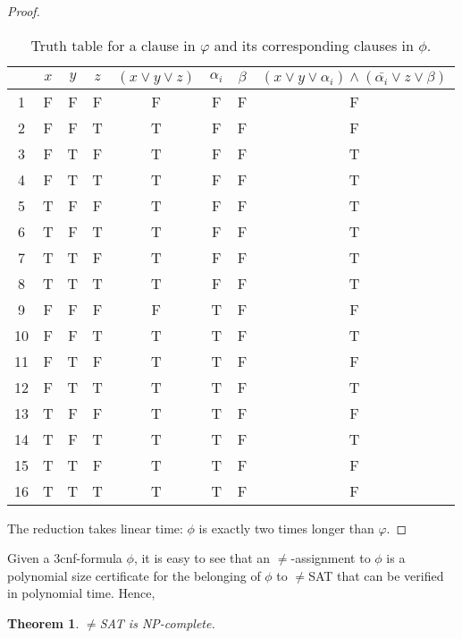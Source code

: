 \documentclass{article}
\newcommand{\theoremname}{Theorem}
\newtheorem{theorem}{\theoremname}
\begin{document}
\begin{proof}
\begin{table}
	\centering
	\caption{Truth table for a clause in $\varphi$ and its corresponding clauses in
	$\phi$.}\label{table}
	\begin{tabular}{|c|ccc|c|cc|c|}
	\hline
	& $x$ & $y$ & $z$ & $(x \lor y \lor z)$ & $\alpha_i$ & $\beta$ & $(x \lor
	y \lor \alpha_i) \land (\bar{\alpha_i} \lor z \lor \beta)$ \\
	\hline
	1 & F & F & F & F & F & F & F \\
	2 & F & F & T & T & F & F & F \\
	3 & F & T & F & T & F & F & T \\
	4 & F & T & T & T & F & F & T \\
	5 & T & F & F & T & F & F & T \\
	6 & T & F & T & T & F & F & T \\
	7 & T & T & F & T & F & F & T \\
	8 & T & T & T & T & F & F & T \\
	\hline
	9 & F & F & F & F & T & F & F \\
	10 & F & F & T & T & T & F & T \\
	11 & F & T & F & T & T & F & F \\
	12 & F & T & T & T & T & F & T \\
	13 & T & F & F & T & T & F & F \\
	14 & T & F & T & T & T & F & T \\
	15 & T & T & F & T & T & F & F \\
	16 & T & T & T & T & T & F & F \\
	\hline
\end{tabular}
\end{table}

The reduction takes linear time: $\phi$ is exactly two times longer than $\varphi$.
\end{proof}

Given a 3cnf-formula $\phi$, it is easy to see that an $\ne$-assignment to
$\phi$ is a polynomial size certificate for the belonging of $\phi$ to $\ne$SAT
that can be verified in polynomial time. Hence,
\begin{theorem}
  $\ne$SAT is NP-complete.
\end{theorem}
\end{document}
